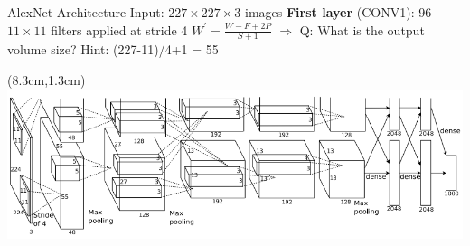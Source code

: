 \documentclass[serif, aspectratio=169]{beamer}
\begin{document}
\begin{frame}{AlexNet Architecture}
	\vspace{0.5cm}
	Input: $227 \times 227 \times 3$ images \vspace{0.3cm} \newline 
	\textbf{First layer} (CONV1): 96 $11 \times 11$ filters applied at stride 4 \hspace{2cm} $W^{\prime} = \frac{W - F + 2P}{S + 1}$ \newline
	$\Rightarrow$ \color{blue} Q: What is the output volume size? Hint: (227-11)/4+1 = 55
	
	\begin{textblock*}{5cm}(8.3cm,1.3cm) %
	\includegraphics[keepaspectratio, scale=0.25]{pic/alexnet}
	\end{textblock*}
\end{frame}
\end{document}
